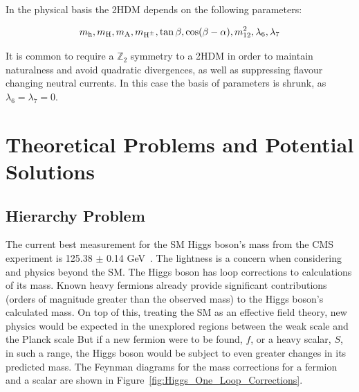 In the physical basis the \ac{2HDM} depends on the following parameters:

\begin{equation}
m_{{\text{h}}}, m_{{\text{H}}}, m_{{\text{A}}}, m_{{\text{H}^{\pm}}}, \tan\beta, \cos(\beta-\alpha), m_{12}^{2}, \lambda_{6}, \lambda_{7}
\end{equation}

It is common to require a $\mathbb{Z}_2$ symmetry to a 2HDM in order to maintain naturalness and avoid quadratic divergences, as well as suppressing flavour changing neutral currents.
In this case the basis of parameters is shrunk, as $\lambda_6 = \lambda_7 = 0$.

\section{Theoretical Problems and Potential Solutions}

\subsection{Hierarchy Problem}

The current best measurement for the \ac{SM} Higgs boson’s mass from the \ac{CMS} experiment is 125.38 $\pm$ 0.14 GeV~\cite{CMS:2020xrn}.
The lightness is a concern when considering  and physics beyond the \ac{SM}. 
The Higgs boson has loop corrections to calculations of its mass. 
Known heavy fermions already provide significant contributions (orders of magnitude greater than the observed mass) to the Higgs boson’s calculated mass. 
On top of this, treating the \ac{SM} as an effective field theory, new physics would be expected in the unexplored regions between the weak scale and the Planck scale
But if a new fermion were to be found, $f$, or a heavy scalar, $S$, in such a range, the Higgs boson would be subject to even greater changes in its predicted mass. 
The Feynman diagrams for the mass corrections for a fermion and a scalar are shown in Figure~\ref{fig:Higgs_One_Loop_Corrections}.

